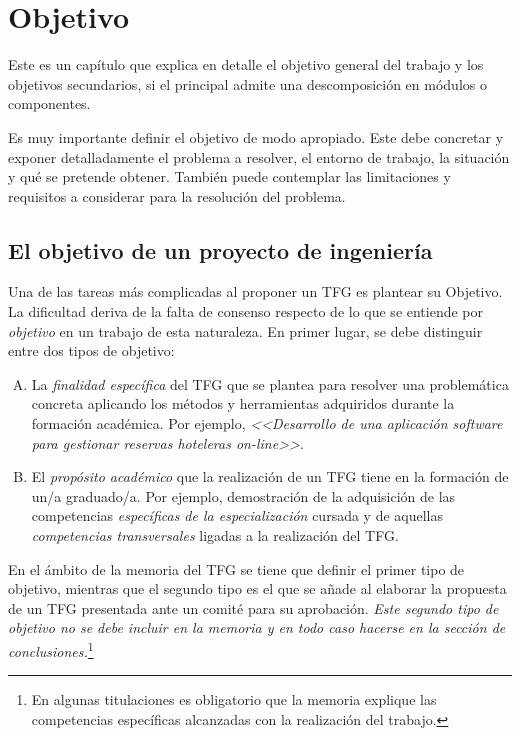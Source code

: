 \chapter{Objetivo}
\label{cap:Objetivo}
Este es un capítulo que explica en detalle el objetivo general del trabajo y los  objetivos secundarios, si el principal admite una descomposición en módulos o componentes. 

Es muy importante definir el objetivo de modo apropiado. Este debe concretar y exponer detalladamente el problema a resolver, el entorno de trabajo, la situación y qué se pretende obtener. También puede contemplar las limitaciones y requisitos a considerar para la resolución del problema.


\section{El objetivo de un proyecto de ingeniería}
Una de las tareas más complicadas al proponer un TFG es plantear su \textsf{Objetivo}. La dificultad deriva de la falta de consenso respecto de lo que se entiende por \emph{objetivo} en un trabajo de esta naturaleza. En primer lugar, se debe distinguir entre dos tipos de objetivo:

\begin{enumerate}[(A)]
	\item La \emph{finalidad específica} del TFG que se plantea para resolver una problemática concreta aplicando los métodos y herramientas adquiridos durante la formación académica. Por ejemplo, \emph{<<Desarrollo de una aplicación software para gestionar reservas hoteleras \emph{on-line}>>}.
	
	\item El \emph{propósito académico} que la realización de un TFG tiene en la formación de un/a graduado/a. Por ejemplo, demostración de la adquisición de las competencias \emph{específicas de la especialización} cursada y de aquellas \emph{competencias transversales} ligadas a la realización del TFG.
\end{enumerate}

En el ámbito de la memoria del TFG se tiene que definir el primer tipo de objetivo, mientras que el segundo tipo es el que se añade al elaborar la propuesta de un TFG presentada ante un comité para su aprobación. \emph{Este segundo tipo de objetivo no se debe incluir en la memoria y en todo caso hacerse en la sección de conclusiones.}\footnote{En algunas titulaciones es obligatorio que la memoria explique las competencias específicas alcanzadas con la realización del trabajo.}

